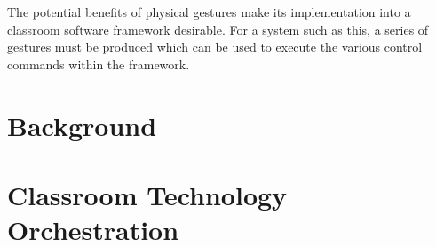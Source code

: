 \documentclass[manuscript, review, screen]{acmart}
\begin{document}
The potential benefits of physical gestures make its implementation into a classroom software framework desirable.
For a system such as this, a series of gestures must be produced which can be used to execute the various control commands within the framework.



\section{Background} 
\label{sec:background}



\section{Classroom Technology Orchestration} 
\label{sec:orchestration}


\end{document}
